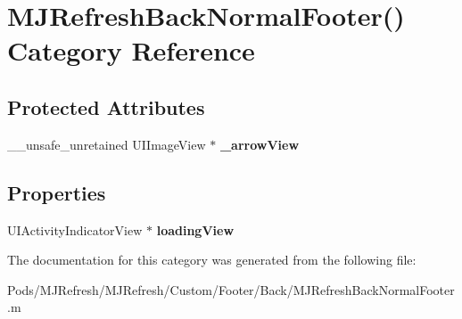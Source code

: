 \hypertarget{category_m_j_refresh_back_normal_footer_07_08}{}\section{M\+J\+Refresh\+Back\+Normal\+Footer() Category Reference}
\label{category_m_j_refresh_back_normal_footer_07_08}
\subsection*{Protected Attributes}
\begin{DoxyCompactItemize}
\item 
\mbox{\label{category_m_j_refresh_back_normal_footer_07_08_a2eb422d666d0fda91d8ae16121f3555f}} 
\+\_\+\+\_\+unsafe\+\_\+unretained U\+I\+Image\+View $\ast$ {\bfseries \+\_\+arrow\+View}
\end{DoxyCompactItemize}
\subsection*{Properties}
\begin{DoxyCompactItemize}
\item 
\mbox{\label{category_m_j_refresh_back_normal_footer_07_08_ada76abaadaa424da4e63df03c8c0b60f}} 
U\+I\+Activity\+Indicator\+View $\ast$ {\bfseries loading\+View}
\end{DoxyCompactItemize}


The documentation for this category was generated from the following file\+:\begin{DoxyCompactItemize}
\item 
Pods/\+M\+J\+Refresh/\+M\+J\+Refresh/\+Custom/\+Footer/\+Back/M\+J\+Refresh\+Back\+Normal\+Footer.\+m\end{DoxyCompactItemize}
